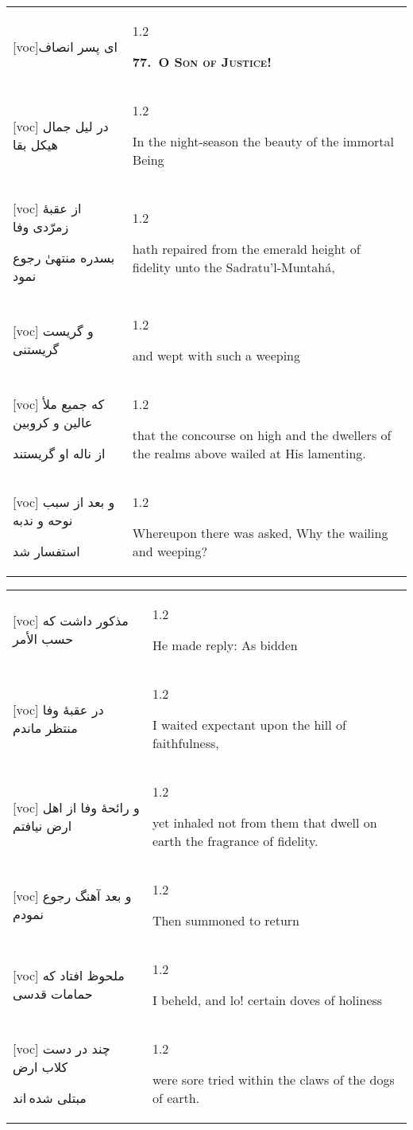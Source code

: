\documentclass[11pt]{article}
\makeatletter
\newenvironment{orig}
  {\begin{farsi}[voc]}
  {\end{farsi}}
\newenvironment{trans}
  {\Large\begin{spacing}{1.2}\raggedright}
  {\end{spacing}}
\newenvironment{word}
  {\begin{tabular}[t]{p{2.75in}@{\hspace{3em}}p{2.875in}}}
  {\end{tabular}}
\newcommand{\ayat}[2]{\begin{orig}#1\end{orig} & \begin{trans}#2\end{trans}}
\newcommand{\heading}[2]{\textsc{\textbf{#1}} %
}
\makeatother
\begin{document}
\pagebreak

\begin{word}
\ayat{ای پسر انصاف}{\heading{77.~O Son of Justice!}{}} \\ \ayat{
در ليل جمال هيکل بقا
}{In the night-season the beauty of the immortal Being} \vspace{-1ex}\\ \ayat{
از عقبۀ زمرّدی وفا

بسدره منتهیٰ رجوع نمود
}{hath repaired from the emerald height of fidelity unto the
  Sadratu'l-Muntahá,} \vspace{-1ex}\\ \ayat{
و گريست گريستنی
}{and wept with such a weeping} \vspace{-1ex}\\ \ayat{
که جميع ملأ عالين و کروبين

از ناله او گريستند
}{that the concourse on high and the dwellers of the realms above wailed at
  His lamenting.} \vspace{-1ex}\\ \ayat{
و بعد از سبب نوحه و ندبه

استفسار شد
}{Whereupon there was asked, Why the wailing and weeping?}
\end{word}

\pagebreak

\begin{word}
\ayat{
مذکور داشت که حسب الأمر
}{He made reply: As bidden} \vspace{-1ex}\\ \ayat{
در عقبۀ وفا منتظر ماندم
}{I waited expectant upon the hill of faithfulness,} \vspace{-1ex}\\ \ayat{
و رائحۀ وفا از اهل ارض نيافتم
}{yet inhaled not from them that dwell on earth the fragrance of
  fidelity.} \vspace{-1ex}\\ \ayat{
و بعد آهنگ رجوع نمودم
}{Then summoned to return} \vspace{-1ex}\\ \ayat{
ملحوظ افتاد که حمامات قدسی
}{I beheld, and lo! certain doves of holiness} \vspace{-1ex}\\ \ayat{
چند در دست کلاب ارض

مبتلی شده اند
}{were sore tried within the claws of the dogs of earth.}
\end{word}

\pagebreak
\end{document}
